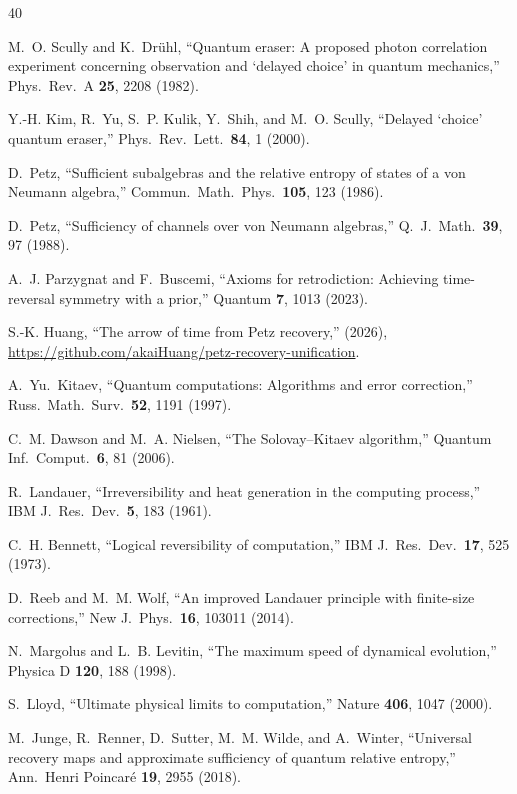 \documentclass[prl,twocolumn,superscriptaddress,longbibliography,floatfix]{revtex4-2}
\begin{document}
\begin{thebibliography}{40}

M.~O. Scully and K.~Dr\"uhl,
``Quantum eraser: A proposed photon correlation experiment concerning
observation and `delayed choice' in quantum mechanics,''
Phys.\ Rev.\ A \textbf{25}, 2208 (1982).

Y.-H. Kim, R.~Yu, S.~P. Kulik, Y.~Shih, and M.~O. Scully,
``Delayed `choice' quantum eraser,''
Phys.\ Rev.\ Lett.\ \textbf{84}, 1 (2000).

D.~Petz,
``Sufficient subalgebras and the relative entropy of states of a
von Neumann algebra,''
Commun.\ Math.\ Phys.\ \textbf{105}, 123 (1986).

D.~Petz,
``Sufficiency of channels over von Neumann algebras,''
Q.\ J.\ Math.\ \textbf{39}, 97 (1988).

A.~J. Parzygnat and F.~Buscemi,
``Axioms for retrodiction: Achieving time-reversal symmetry with a
prior,''
Quantum \textbf{7}, 1013 (2023).

S.-K. Huang,
``The arrow of time from Petz recovery,''
(2026), \url{https://github.com/akaiHuang/petz-recovery-unification}.

A.~Yu.~Kitaev,
``Quantum computations: Algorithms and error correction,''
Russ.\ Math.\ Surv.\ \textbf{52}, 1191 (1997).

C.~M. Dawson and M.~A. Nielsen,
``The Solovay--Kitaev algorithm,''
Quantum Inf.\ Comput.\ \textbf{6}, 81 (2006).

R.~Landauer,
``Irreversibility and heat generation in the computing process,''
IBM J.\ Res.\ Dev.\ \textbf{5}, 183 (1961).

C.~H. Bennett,
``Logical reversibility of computation,''
IBM J.\ Res.\ Dev.\ \textbf{17}, 525 (1973).

D.~Reeb and M.~M. Wolf,
``An improved Landauer principle with finite-size corrections,''
New J.\ Phys.\ \textbf{16}, 103011 (2014).

N.~Margolus and L.~B. Levitin,
``The maximum speed of dynamical evolution,''
Physica D \textbf{120}, 188 (1998).

S.~Lloyd,
``Ultimate physical limits to computation,''
Nature \textbf{406}, 1047 (2000).

M.~Junge, R.~Renner, D.~Sutter, M.~M. Wilde, and A.~Winter,
``Universal recovery maps and approximate sufficiency of quantum
relative entropy,''
Ann.\ Henri Poincar\'e \textbf{19}, 2955 (2018).


\end{thebibliography}
\end{document}
